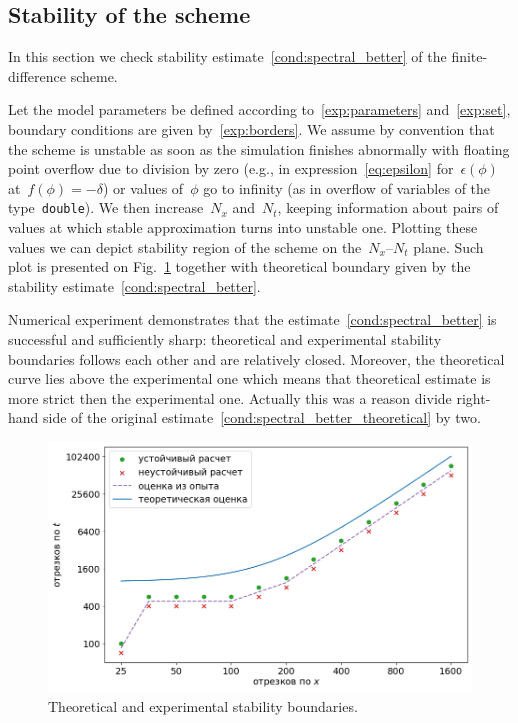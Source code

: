 \subsection{Stability of the scheme}

In this section we check stability
estimate~\eqref{cond:spectral_better} of the
finite-difference scheme.

Let the model parameters be defined according
to~\eqref{exp:parameters} and~\eqref{exp:set}, boundary conditions are given by~\eqref{exp:borders}.
We assume by convention that the scheme is unstable as soon as
the simulation finishes abnormally with floating point overflow
due to division by zero (e.g., in expression~\eqref{eq:epsilon}
for~$\epsilon(\phi)$
at~$f(\phi) = -\delta$)
or values of~$\phi$ go to infinity
(as in overflow of  variables of the type~\texttt{double}).
We then increase~$N_x$ and~$N_t$, keeping information about
pairs of values at which stable approximation turns into unstable one.
Plotting these values we can depict stability region of the scheme
on the~$N_x$--$N_t$ plane.
Such plot is presented on Fig.~\ref{fig:stability_bounds}
together with theoretical boundary given by the stability
estimate~\eqref{cond:spectral_better}.

Numerical experiment demonstrates that the
estimate~\eqref{cond:spectral_better} is successful and sufficiently
sharp: theoretical and experimental stability boundaries follows each other and
are relatively closed. Moreover, the theoretical curve lies above
the experimental one which means that theoretical estimate is more
strict then the experimental one. Actually this was a reason divide
right-hand side of the original estimate~\eqref{cond:spectral_better_theoretical} by two.
\begin{figure}[!t]
	\centering
	\includegraphics[width=\textwidth]{figures/stability_bounds.png}
	\vspace{-0.7cm}
	\caption{Theoretical and experimental stability boundaries.}
	\label{fig:stability_bounds}
\end{figure}


